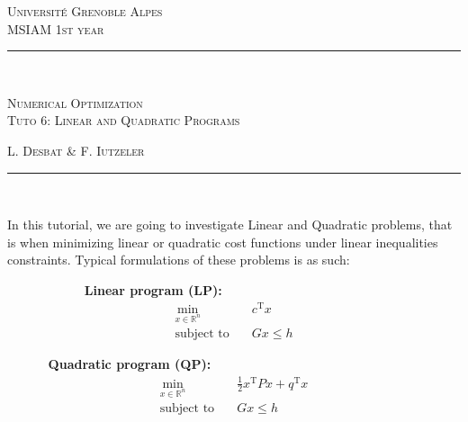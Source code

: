 \documentclass[a4paper,twoside,10pt]{amsart}
\numberwithin{equation}{section} %
\numberwithin{figure}{section} %
\numberwithin{table}{section} %
\newcommand{\horrule}[1]{\rule{\linewidth}{#1}} %
\theoremstyle{definition}
\begin{document}


\normalfont \normalsize 
\noindent\textsc{\small Universit\'e Grenoble Alpes }\\
\noindent\textsc{\small MSIAM 1st year} \\ [0.3cm] %
\horrule{0.5pt} \\[0.4cm] %
\begin{center}
{\LARGE \scshape  Numerical Optimization \\ Tuto 6: Linear and Quadratic Programs} \\ %
\end{center}
\noindent\textsc{\hfill L. Desbat \& F. Iutzeler } 
\horrule{2pt} \\[0.5cm] %



\setcounter{section}{0}
\renewcommand{\thesection}{\Alph{section}} 
\renewcommand*{\theHsection}{TD.\the\value{section}}


\vspace*{0.5cm}



In this tutorial, we are going to investigate Linear and Quadratic problems, that is when minimizing linear or quadratic cost functions under linear inequalities constraints. Typical formulations of these problems is as such:

\vspace*{0.5cm}


\begin{minipage}{0.4\textwidth}
\textbf{~~~~~~~~~~ Linear program (LP):}\\
\begin{align*}
\min_{x\in\mathbb{R}^n}  & ~~~  c^\mathrm{T} x  \\
\text{subject to } & ~~~ Gx \leq h 
\end{align*}
\end{minipage}\hfill
\begin{minipage}{0.4\textwidth}
\textbf{~~~~~ Quadratic program (QP):}
\begin{align*}
\min_{x\in\mathbb{R}^n}  & ~~~  \frac{1}{2} x^\mathrm{T} P x +  q^\mathrm{T} x  \\
\text{subject to } & ~~~ Gx \leq h 
\end{align*}
\end{minipage}
\end{document}
